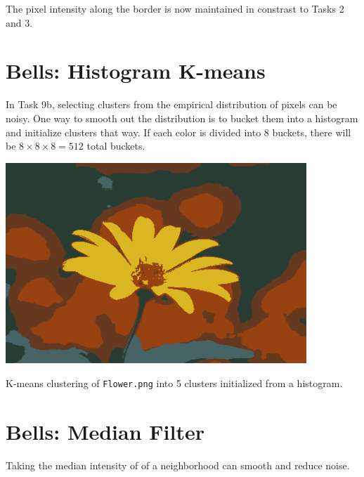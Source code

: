 \documentclass[letterpaper]{article}
\begin{document}
The pixel intensity along the border is now maintained in constrast to Tasks 2 and 3.

\section*{Bells: Histogram K-means}

In Task 9b, selecting clusters from the empirical distribution of pixels can be
noisy. One way to smooth out the distribution is to bucket them into a histogram
and initialize clusters that way. If each color is divided into $8$ buckets,
there will be $8 \times 8 \times 8 = 512$ total buckets.

\begin{center}
  \includegraphics[width=0.85\textwidth]{histogramtask.png}
  
  K-means clustering of \texttt{Flower.png} into 5 clusters initialized from a
  histogram.
\end{center}

\section*{Bells: Median Filter}

Taking the median intensity of of a neighborhood can smooth and reduce noise.
\end{document}
